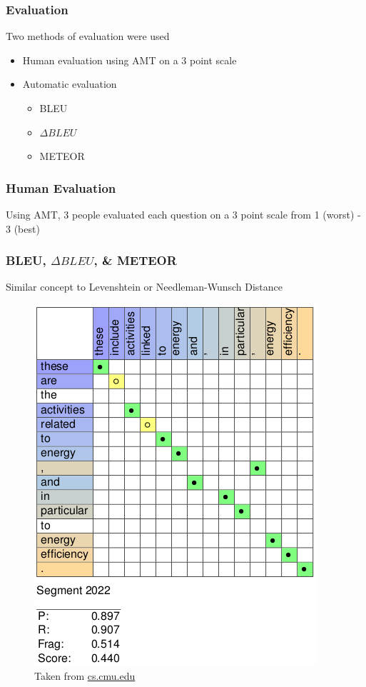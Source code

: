 \documentclass[xcolor=dvipsnames]{beamer}
\begin{document}
		\begin{frame}
			\frametitle{Evaluation} 
			Two methods of evaluation were used
			\begin{itemize}
				\item<1-> Human evaluation using AMT on a 3 point scale
				\item<2-> Automatic evaluation
					\begin{itemize}
						\item BLEU \cite{papineni2002bleu}
						\item $\Delta BLEU$ \cite{DBLP:journals/corr/GalleyBSJAQMGD15}
						\item METEOR \cite{denkowski:lavie:meteor-wmt:2014}
					\end{itemize}
			\end{itemize}
		\end{frame}
	
		\begin{frame}
			\frametitle{Human Evaluation}
			Using AMT, 3 people evaluated each question on a 3 point scale from 1 (worst) - 3 (best)
		\end{frame}
	
		\begin{frame}
			\frametitle{BLEU, $\Delta BLEU$, \& METEOR}
			Similar concept to Levenshtein or Needleman-Wunsch Distance
			\begin{center}
				\begin{figure}
					\includegraphics[scale=.3]{images/alignment1.png}
					\caption{\footnotesize{Taken from \href{http://www.cs.cmu.edu/~alavie/METEOR/examples.html}{cs.cmu.edu}}}
				\end{figure}
			\end{center}
		\end{frame}
		
\end{document}
